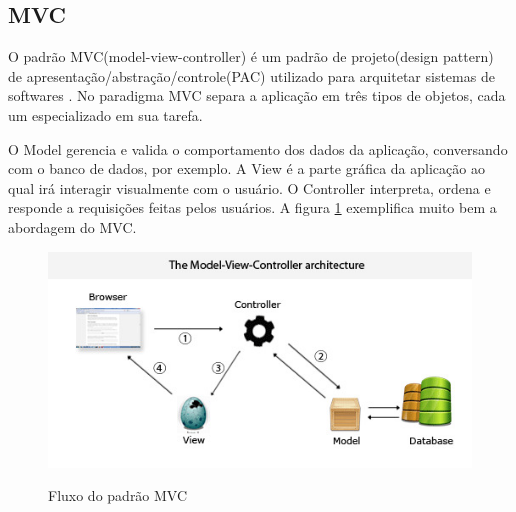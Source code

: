 \subsection{MVC}
\label{subsec:thresholding}

O padrão MVC(model-view-controller) é um padrão de projeto(design pattern) de apresentação/abstração/controle(PAC) utilizado para arquitetar sistemas de softwares \cite{leff2001webmvc}. No paradigma MVC separa a aplicação em três tipos de objetos, cada um especializado em sua tarefa. \par
O Model gerencia e valida o comportamento dos dados da aplicação, conversando com o banco de dados, por exemplo. A View é a parte gráfica da aplicação ao qual irá interagir visualmente com o usuário. O Controller interpreta, ordena e responde a requisições feitas pelos usuários.\cite{burbeck1997applications} A figura \ref{fig:mvc} exemplifica muito bem a abordagem do MVC. \par

\begin{figure}[htbp!]
  \centering
  \caption{Fluxo do padrão MVC}
  \includegraphics[width=1\textwidth]{figs/mvc.jpg}
    \label{fig:mvc}
\end{figure}



